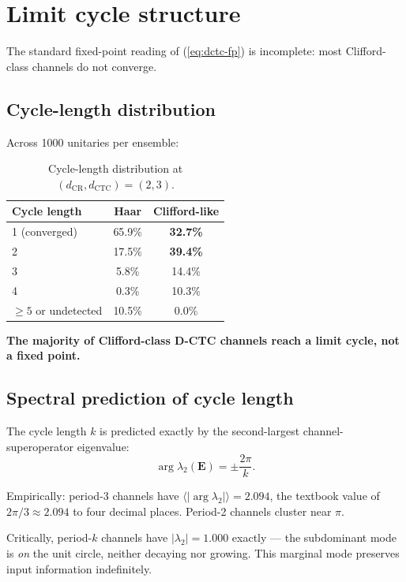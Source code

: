 \documentclass[11pt,a4paper]{article}
\begin{document}
\section{Limit cycle structure}

The standard fixed-point reading of (\ref{eq:dctc-fp}) is incomplete:
most Clifford-class channels do not converge.

\subsection{Cycle-length distribution}

Across 1000 unitaries per ensemble:

\begin{table}[h]
\centering
\caption{Cycle-length distribution at $(d_{\text{CR}}, d_{\text{CTC}}) = (2, 3)$.}
\label{tab:cycle-dist}
\begin{tabular}{lcc}
\toprule
Cycle length & Haar & Clifford-like \\
\midrule
1 (converged) & 65.9\% & \textbf{32.7\%} \\
2 & 17.5\% & \textbf{39.4\%} \\
3 & 5.8\% & 14.4\% \\
4 & 0.3\% & 10.3\% \\
$\ge 5$ or undetected & 10.5\% & 0.0\% \\
\bottomrule
\end{tabular}
\end{table}

\textbf{The majority of Clifford-class D-CTC channels reach a limit
cycle, not a fixed point.}

\subsection{Spectral prediction of cycle length}

The cycle length $k$ is predicted exactly by the second-largest
channel-superoperator eigenvalue:
\begin{equation}
\boxed{\arg \lambda_2(\mathbf{E}) = \pm \frac{2\pi}{k}.}
\end{equation}

Empirically: period-3 channels have $\langle |\arg\lambda_2|\rangle =
2.094$, the textbook value of $2\pi/3 \approx 2.094$ to four decimal
places. Period-2 channels cluster near $\pi$.

Critically, period-$k$ channels have $|\lambda_2| = 1.000$ exactly
--- the subdominant mode is \emph{on} the unit circle, neither
decaying nor growing. This marginal mode preserves input information
indefinitely.
\end{document}
